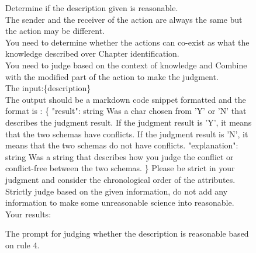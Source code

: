 \begin{figure}[htbp]
\centering
\begin{tcolorbox}
Determine if the description given is reasonable.
\\
The sender and the receiver of the action are always the same but the action may be different.\\
You need to determine whether the actions can co-exist as what the knowledge described over Chapter identification.\\
You need to judge based on the context of knowledge and Combine with the modified part of the action to make the judgment.\\
The input:\{description\}\\
The output should be a markdown code snippet formatted and the format is : 
\{
        "result": string  Was a char chosen from 'Y' or 'N' that describes the judgment result. If the judgment result is 'Y', it means that the two schemas have conflicts. If the judgment result is 'N', it means that the two schemas do not have conflicts.
        "explanation": string Was a string that describes how you judge the conflict or conflict-free between the two schemas.
\}
Please be strict in your judgment and consider the chronological order of the attributes.\\
Strictly judge based on the given information, do not add any information to make some unreasonable science into reasonable.\\
Your results:\\
\end{tcolorbox}
\caption{The prompt for judging whether the description is reasonable based on rule 4.}
\label{tab:judge4}
\end{figure}


